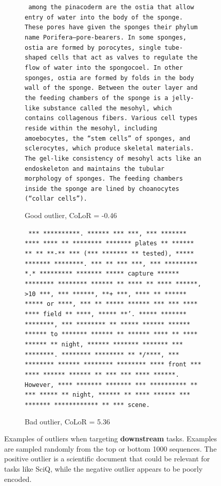 \documentclass{article}
\begin{document}
\begin{figure}[h]
    \begin{subfigure}[b]{0.45\textwidth}
        \centering
        {\small
        \texttt{
 among the pinacoderm are the ostia that allow entry of water into the body of the sponge. These pores have given the sponges their phylum name Porifera—pore-bearers. In some sponges, ostia are formed by porocytes, single tube-shaped cells that act as valves to regulate the flow of water into the spongocoel. In other sponges, ostia are formed by folds in the body wall of the sponge. Between the outer layer and the feeding chambers of the sponge is a jelly-like substance called the mesohyl, which contains collagenous fibers. Various cell types reside within the mesohyl, including amoebocytes, the “stem cells” of sponges, and sclerocytes, which produce skeletal materials. The gel-like consistency of mesohyl acts like an endoskeleton and maintains the tubular morphology of sponges.
The feeding chambers inside the sponge are lined by choanocytes (“collar cells”).}}
        \caption{Good outlier, CoLoR = -0.46}
    \end{subfigure}
    \hfill
        \begin{subfigure}[b]{0.45\textwidth}
        \centering
        {\small
\texttt{
 *** **********.
****** *** ***, *** ******* **** **** ** ******** ******* plates ** ****** ** ** **-** *** (*** ******* ** tested), ***** ******* ********.
*** ** *** ***, *** ********* *.* ********* ******* ***** capture ****** ******** ******** ****** ** **** ** **** ******, >10 ***, *** ******, **+ ***, **** ** ****** ***** or ****, *** ** ***** ****** *** *** **** **** field ** ****, ***** **'.
***** ******* ********, *** ******** ** ***** ****** ****** ****** to ******* ****** ** ****** **** ** **** ****** ** night, ****** ******* ******* *** ********.
******** ******** ** */****, *** ******** ****** ******** ******** **** front *** **** ****** ****** ** *** *** **** ******. However, **** ******* ******* *** ********** ** *** ***** ** night, ****** ** **** ****** *** ******* ************ ** *** scene.
}}
        \caption{Bad outlier, CoLoR = 5.36}
    \end{subfigure}
    \caption{Examples of outliers when targeting \textbf{downstream} tasks. Examples are sampled randomly from the top or bottom 1000 sequences. The positive outlier is a scientific document that could be relevant for tasks like SciQ, while the negative outlier appears to be poorly encoded.}
    \label{fig:down_outliers}
\end{figure}
\end{document}
